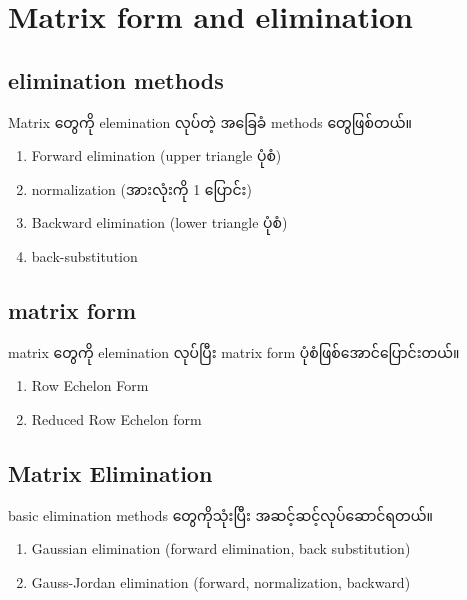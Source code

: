 \section{Matrix form and elimination}
\subsection{elimination methods}
Matrix တွေကို elemination လုပ်တဲ့ အခြေခံ methods တွေဖြစ်တယ်။
\begin{enumerate}
    \item Forward elimination (upper triangle ပုံစံ)
    \item normalization (အားလုံးကို 1 ပြောင်း)
    \item Backward elimination (lower triangle ပုံစံ)
    \item back-substitution 
\end{enumerate}
\subsection{matrix form}
matrix တွေကို elemination လုပ်ပြီး matrix form ပုံစံဖြစ်အောင်ပြောင်းတယ်။
\begin{enumerate}
    \item Row Echelon Form
    \item Reduced Row Echelon form
\end{enumerate}
\subsection{Matrix Elimination}
basic elimination methods တွေကိုသုံးပြီး အဆင့်ဆင့်လုပ်ဆောင်ရတယ်။
\begin{enumerate}
    \item Gaussian elimination (forward elimination, back substitution)
    \item Gauss-Jordan elimination (forward, normalization, backward)
\end{enumerate}